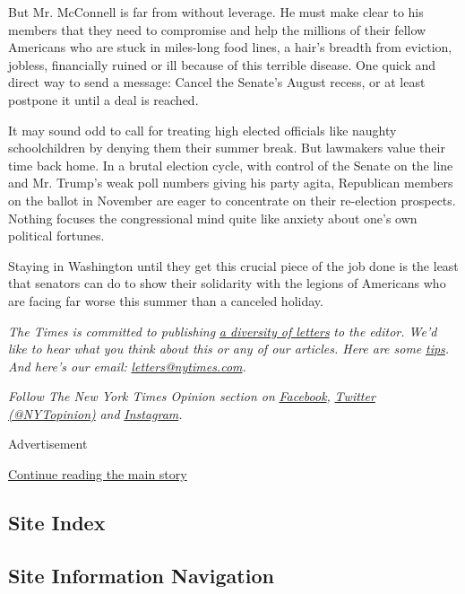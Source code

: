 But Mr. McConnell is far from without leverage. He must make clear to
his members that they need to compromise and help the millions of their
fellow Americans who are stuck in miles-long food lines, a hair's
breadth from eviction, jobless, financially ruined or ill because of
this terrible disease. One quick and direct way to send a message:
Cancel the Senate's August recess, or at least postpone it until a deal
is reached.

It may sound odd to call for treating high elected officials like
naughty schoolchildren by denying them their summer break. But lawmakers
value their time back home. In a brutal election cycle, with control of
the Senate on the line and Mr. Trump's weak poll numbers giving his
party agita, Republican members on the ballot in November are eager to
concentrate on their re-election prospects. Nothing focuses the
congressional mind quite like anxiety about one's own political
fortunes.

Staying in Washington until they get this crucial piece of the job done
is the least that senators can do to show their solidarity with the
legions of Americans who are facing far worse this summer than a
canceled holiday.

\emph{The Times is committed to publishing}
\href{https://www.nytimes.com/2019/01/31/opinion/letters/letters-to-editor-new-york-times-women.html}{\emph{a
diversity of letters}} \emph{to the editor. We'd like to hear what you
think about this or any of our articles. Here are some}
\href{https://help.nytimes.com/hc/en-us/articles/115014925288-How-to-submit-a-letter-to-the-editor}{\emph{tips}}\emph{.
And here's our email:}
\href{mailto:letters@nytimes.com}{\emph{letters@nytimes.com}}\emph{.}

\emph{Follow The New York Times Opinion section on}
\href{https://www.facebook.com/nytopinion}{\emph{Facebook}}\emph{,}
\href{http://twitter.com/NYTOpinion}{\emph{Twitter (@NYTopinion)}}
\emph{and}
\href{https://www.instagram.com/nytopinion/}{\emph{Instagram}}\emph{.}

Advertisement

\protect\hyperlink{after-bottom}{Continue reading the main story}

\hypertarget{site-index}{%
\subsection{Site Index}\label{site-index}}

\hypertarget{site-information-navigation}{%
\subsection{Site Information
Navigation}\label{site-information-navigation}}

